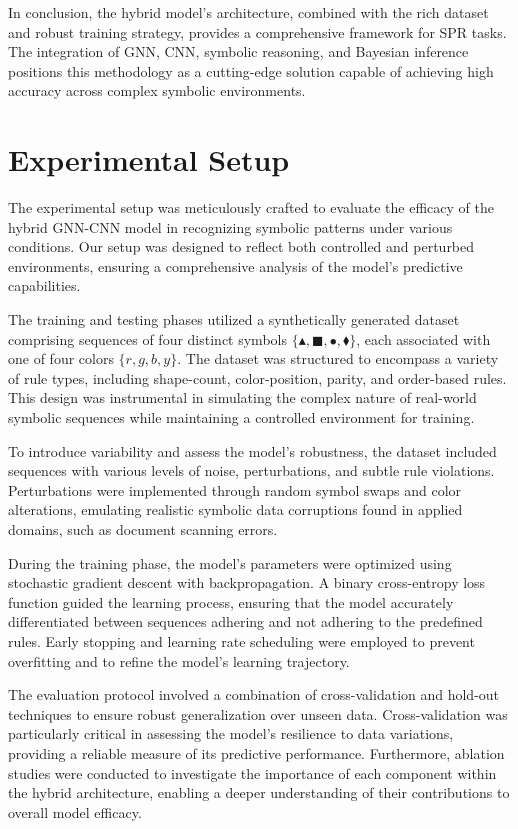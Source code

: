 \documentclass{article}
\begin{document}
In conclusion, the hybrid model's architecture, combined with the rich dataset and robust training strategy, provides a comprehensive framework for SPR tasks. The integration of GNN, CNN, symbolic reasoning, and Bayesian inference positions this methodology as a cutting-edge solution capable of achieving high accuracy across complex symbolic environments.

\section{Experimental Setup}
The experimental setup was meticulously crafted to evaluate the efficacy of the hybrid GNN-CNN model in recognizing symbolic patterns under various conditions. Our setup was designed to reflect both controlled and perturbed environments, ensuring a comprehensive analysis of the model's predictive capabilities.

The training and testing phases utilized a synthetically generated dataset comprising sequences of four distinct symbols $\{\blacktriangle, \blacksquare, \bullet, \blacklozenge\}$, each associated with one of four colors $\{r, g, b, y\}$. The dataset was structured to encompass a variety of rule types, including shape-count, color-position, parity, and order-based rules. This design was instrumental in simulating the complex nature of real-world symbolic sequences while maintaining a controlled environment for training.

To introduce variability and assess the model's robustness, the dataset included sequences with various levels of noise, perturbations, and subtle rule violations. Perturbations were implemented through random symbol swaps and color alterations, emulating realistic symbolic data corruptions found in applied domains, such as document scanning errors.
 
During the training phase, the model's parameters were optimized using stochastic gradient descent with backpropagation. A binary cross-entropy loss function guided the learning process, ensuring that the model accurately differentiated between sequences adhering and not adhering to the predefined rules. Early stopping and learning rate scheduling were employed to prevent overfitting and to refine the model's learning trajectory.

The evaluation protocol involved a combination of cross-validation and hold-out techniques to ensure robust generalization over unseen data. Cross-validation was particularly critical in assessing the model's resilience to data variations, providing a reliable measure of its predictive performance. Furthermore, ablation studies were conducted to investigate the importance of each component within the hybrid architecture, enabling a deeper understanding of their contributions to overall model efficacy.
\end{document}
